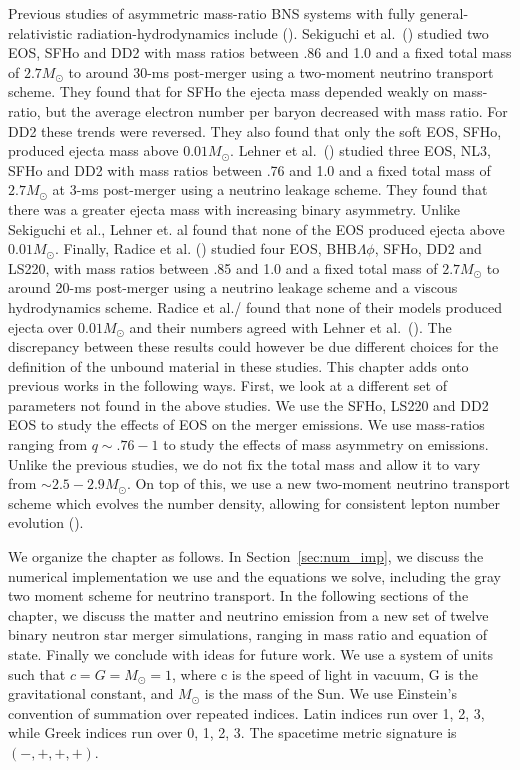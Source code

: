 Previous studies of asymmetric mass-ratio BNS systems with fully general-relativistic radiation-hydrodynamics include
(\citet*{sekiguchi2016dynamical,lehner2016unequal,radice2018binary}). Sekiguchi et al.~(\citet*{sekiguchi2016dynamical}) studied two EOS, SFHo and DD2 with mass ratios between .86 and 1.0 and a fixed total mass of $2.7M_\odot$ to around 30-ms post-merger using a two-moment neutrino transport scheme. They found that for SFHo the ejecta mass depended weakly on mass-ratio, but the average electron number per baryon decreased with mass ratio. For DD2 these trends were reversed. They also found that only the soft EOS, SFHo, produced ejecta mass above $0.01M_\odot$. Lehner et al.~(\citet*{lehner2016unequal}) studied three EOS, NL3, SFHo and DD2 with mass ratios between .76 and 1.0 and a fixed total mass of $2.7M_\odot$ at 3-ms post-merger using a neutrino leakage scheme. They found that there was a greater ejecta mass with increasing binary asymmetry. Unlike Sekiguchi et al., Lehner et. al found that none of the EOS produced ejecta above $0.01M_\odot$. Finally, Radice et al. (\citet*{radice2018binary}) studied four EOS, BHB$\Lambda\phi$, SFHo, DD2 and LS220, with mass ratios between .85 and 1.0 and a fixed total mass of $2.7M_\odot$ to around 20-ms post-merger  using a neutrino leakage scheme and a viscous hydrodynamics scheme. Radice et al./ found that  none of their models produced ejecta over $0.01M_\odot$ and their numbers agreed with Lehner et al.~(\citet*{lehner2016unequal}). The discrepancy between these results could however be due different choices for the definition of the unbound material in these studies. This chapter adds onto previous works in the following ways. First, we look at a different set of parameters not found in the above studies. We use the SFHo, LS220 and DD2 EOS to study the effects of EOS on the merger emissions. We use mass-ratios ranging from $q \sim.76-1$ to study the effects of mass asymmetry on emissions. Unlike the previous studies, we do not fix the total mass and allow it to vary from $\sim 2.5-2.9M_\odot$. On top of this, we use a new two-moment neutrino transport scheme which evolves the number density, allowing for consistent lepton number evolution (\citet*{foucart:2016rxm}). 

We organize the chapter as follows. In Section~\ref{sec:num_imp}, we discuss the numerical implementation we use and the
equations we solve, including the gray two moment scheme for neutrino transport. In the following
sections of the chapter, we discuss the matter and neutrino emission from a new set of
twelve binary neutron star merger simulations, ranging in mass ratio and equation of state.
Finally we conclude with ideas for future work. We use a system of units such
that $c = G = M_\odot = 1$, where c is the speed of light in
vacuum, G is the gravitational constant, and $M_\odot$ is the mass
of the Sun. We use Einstein's convention of summation over
repeated indices. Latin indices run over 1, 2, 3, while Greek
indices run over 0, 1, 2, 3. The spacetime metric signature is $(-,+,+,+)$.

